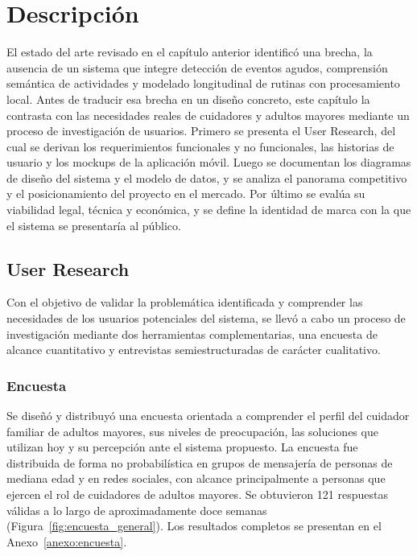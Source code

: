 \chapter{Descripción}\label{chapter03}

El estado del arte revisado en el capítulo anterior identificó una brecha, la ausencia de un sistema que integre detección de eventos agudos, comprensión semántica de actividades y modelado longitudinal de rutinas con procesamiento local.
Antes de traducir esa brecha en un diseño concreto, este capítulo la contrasta con las necesidades reales de cuidadores y adultos mayores mediante un proceso de investigación de usuarios.
Primero se presenta el User Research, del cual se derivan los requerimientos funcionales y no funcionales, las historias de usuario y los mockups de la aplicación móvil.
Luego se documentan los diagramas de diseño del sistema y el modelo de datos, y se analiza el panorama competitivo y el posicionamiento del proyecto en el mercado.
Por último se evalúa su viabilidad legal, técnica y económica, y se define la identidad de marca con la que el sistema se presentaría al público.

\section{User Research}

Con el objetivo de validar la problemática identificada y comprender las necesidades de los usuarios potenciales del sistema, se llevó a cabo un proceso de investigación mediante dos herramientas complementarias, una encuesta de alcance cuantitativo y entrevistas semiestructuradas de carácter cualitativo.

\subsection{Encuesta}

Se diseñó y distribuyó una encuesta orientada a comprender el perfil del cuidador familiar de adultos mayores, sus niveles de preocupación, las soluciones que utilizan hoy y su percepción ante el sistema propuesto.
La encuesta fue distribuida de forma no probabilística en grupos de mensajería de personas de mediana edad y en redes sociales, con alcance principalmente a personas que ejercen el rol de cuidadores de adultos mayores.
Se obtuvieron 121 respuestas válidas a lo largo de aproximadamente doce semanas (Figura~\ref{fig:encuesta_general}).
Los resultados completos se presentan en el Anexo~\ref{anexo:encuesta}.

